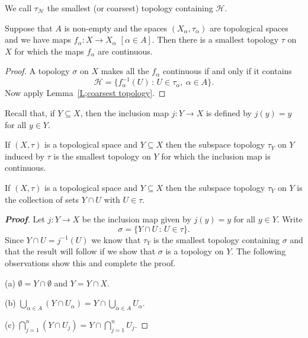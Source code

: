 We call $\tau_{\mathcal H}$ the smallest (or coarsest)  topology
containing ${\mathcal H}$.

\begin{lemma} Suppose that $A$ is non-empty and the 
spaces $(X_{\alpha},\tau_{\alpha})$
are topological spaces and we have maps 
$f_{\alpha}:X\rightarrow X_{\alpha}$ $[\alpha\in A]$.
Then there is a smallest topology $\tau$ on $X$ for which
the maps $f_{\alpha}$ are continuous.
\end{lemma}

\begin{proof} A topology $\sigma$ on $X$ makes all the $f_{\alpha}$
continuous if and only if it contains
\[{\mathcal H}=\{f_{\alpha}^{-1}(U)\,:\,
U\in\tau_{\alpha},\ \alpha\in A\}.\]
Now apply Lemma~\ref{L;coarsest topology}.
\end{proof}

Recall that, if $Y\subseteq X$, then the inclusion map $j:Y\rightarrow X$
is defined by $j(y)=y$ for all $y\in Y$.

\begin{definition}\label{D;subspace topology}
If $(X,\tau)$ is a topological space
and $Y\subseteq X$ then the subspace topology $\tau_{Y}$ on $Y$
induced by $\tau$ is the smallest topology on $Y$ for which the
inclusion map is continuous.
\end{definition}


\begin{lemma}\label{L;subspace topology} 
If $(X,\tau)$ is a topological space
and $Y\subseteq X$ then the subspace topology $\tau_{Y}$ on $Y$
is the collection of sets $Y\cap U$ with $U\in\tau$.
\end{lemma}
\begin{proof}[\bf Proof] Let $j:Y\rightarrow X$ be the inclusion
map given by $j(y)=y$ for all $y\in Y$.
Write 
\[\sigma=\{Y\cap U\,:\,U\in\tau\}.\]
Since $Y\cap U=j^{-1}(U)$ we know that $\tau_{Y}$
is the smallest topology containing $\sigma$
and that the result will follow if we show that $\sigma$ is a topology
on $Y$. The following observations show this and complete
the proof.

(a) ${\emptyset}=Y\cap{\emptyset}$ and $Y=Y\cap X$.

(b) $\bigcup_{\alpha\in A}(Y\cap U_{\alpha})
=Y\cap\bigcup_{\alpha\in A}U_{\alpha}$.

(c) $\bigcap_{j=1}^{n}(Y\cap U_{j})=Y\cap\bigcap_{j=1}^{n}U_{j}$.
\end{proof}



